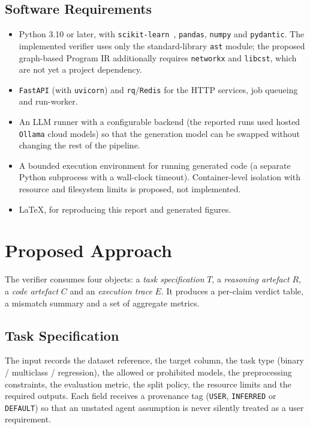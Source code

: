 \subsection{Software Requirements}

\begin{itemize}
    \item Python 3.10 or later, with
    \texttt{scikit-learn}~\cite{sklearn}, \texttt{pandas},
    \texttt{numpy} and \texttt{pydantic}. The implemented verifier
    uses only the standard-library \texttt{ast} module; the proposed
    graph-based Program IR additionally requires \texttt{networkx}
    and \texttt{libcst}, which are not yet a project dependency.
    \item \texttt{FastAPI} (with \texttt{uvicorn}) and
    \texttt{rq}/\texttt{Redis} for the HTTP services, job queueing and
    run-worker.
    \item An LLM runner with a configurable backend (the reported
    runs used hosted \texttt{Ollama} cloud models) so that the
    generation model can be swapped without changing the rest of the
    pipeline.
    \item A bounded execution environment for running generated code
    (a separate Python subprocess with a wall-clock timeout).
    Container-level isolation with resource and filesystem limits is
    proposed, not implemented.
    \item LaTeX, for reproducing this report and generated figures.
\end{itemize}

\section{Proposed Approach}

The verifier consumes four objects: a \emph{task specification} $T$,
a \emph{reasoning artefact} $R$, a \emph{code artefact} $C$ and an
\emph{execution trace} $E$. It produces a per-claim verdict table,
a mismatch summary and a set of aggregate metrics.

\subsection{Task Specification}

The input records the dataset reference, the target column, the task
type (binary / multiclass / regression), the allowed or prohibited
models, the preprocessing constraints, the evaluation metric, the
split policy, the resource limits and the required outputs. Each
field receives a provenance tag (\texttt{USER},
\texttt{INFERRED} or \texttt{DEFAULT}) so that an unstated agent
assumption is never silently treated as a user requirement.

